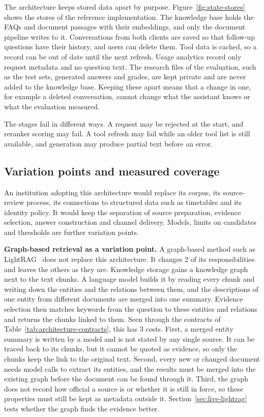 The architecture keeps stored data apart by purpose. Figure~\ref{fig:state-stores} shows the stores of the reference implementation. The knowledge base holds the FAQs and document passages with their embeddings, and only the document pipeline writes to it. Conversations from both clients are saved so that follow-up questions have their history, and users can delete them. Tool data is cached, so a record can be out of date until the next refresh. Usage analytics record only request metadata and no question text. The research files of the evaluation, such as the test sets, generated answers and grades, are kept private and are never added to the knowledge base. Keeping these apart means that a change in one, for example a deleted conversation, cannot change what the assistant knows or what the evaluation measured.



The stages fail in different ways. A request may be rejected at the start, and reranker scoring may fail. A tool refresh may fail while an older tool list is still available, and generation may produce partial text before an error.

\subsection{Variation points and measured coverage}

An institution adopting this architecture would replace its corpus, its source-review process, its connections to structured data such as timetables and its identity policy. It would keep the separation of source preparation, evidence selection, answer construction and channel delivery. Models, limits on candidates and thresholds are further variation points.

\textbf{Graph-based retrieval as a variation point.} A graph-based method such as LightRAG~\cite{guo2024lightrag} does not replace this architecture. It changes 2 of its responsibilities and leaves the others as they are. Knowledge storage gains a knowledge graph next to the text chunks. A language model builds it by reading every chunk and writing down the entities and the relations between them, and the descriptions of one entity from different documents are merged into one summary. Evidence selection then matches keywords from the question to these entities and relations and returns the chunks linked to them. Seen through the contracts of Table~\ref{tab:architecture-contracts}, this has 3 costs. First, a merged entity summary is written by a model and is not stated by any single source. It can be traced back to its chunks, but it cannot be quoted as evidence, so only the chunks keep the link to the original text. Second, every new or changed document needs model calls to extract its entities, and the results must be merged into the existing graph before the document can be found through it. Third, the graph does not record how official a source is or whether it is still in force, so these properties must still be kept as metadata outside it. Section~\ref{sec:live-lightrag} tests whether the graph finds the evidence better.

